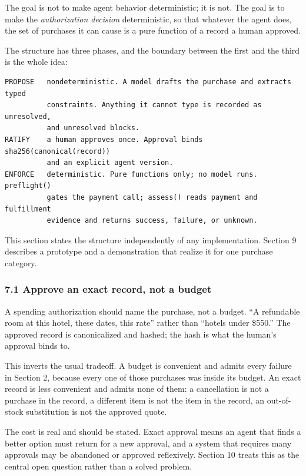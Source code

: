 \documentclass[
  11pt,
  letterpaper,
]{article}
\newcounter{none} %
\begin{document}
The goal is not to make agent behavior deterministic; it is not. The
goal is to make the \emph{authorization decision} deterministic, so that
whatever the agent does, the set of purchases it can cause is a pure
function of a record a human approved.

The structure has three phases, and the boundary between the first and
the third is the whole idea:

\begin{verbatim}
PROPOSE   nondeterministic. A model drafts the purchase and extracts typed
          constraints. Anything it cannot type is recorded as unresolved,
          and unresolved blocks.
RATIFY    a human approves once. Approval binds sha256(canonical(record))
          and an explicit agent version.
ENFORCE   deterministic. Pure functions only; no model runs. preflight()
          gates the payment call; assess() reads payment and fulfillment
          evidence and returns success, failure, or unknown.
\end{verbatim}

This section states the structure independently of any implementation.
Section 9 describes a prototype and a demonstration that realize it for
one purchase category.

\subsubsection{7.1 Approve an exact record, not a
budget}\label{approve-an-exact-record-not-a-budget}

A spending authorization should name the purchase, not a budget. ``A
refundable room at this hotel, these dates, this rate'' rather than
``hotels under \$550.'' The approved record is canonicalized and hashed;
the hash is what the human's approval binds to.

This inverts the usual tradeoff. A budget is convenient and admits every
failure in Section 2, because every one of those purchases was inside
its budget. An exact record is less convenient and admits none of them:
a cancellation is not a purchase in the record, a different item is not
the item in the record, an out-of-stock substitution is not the approved
quote.

The cost is real and should be stated. Exact approval means an agent
that finds a better option must return for a new approval, and a system
that requires many approvals may be abandoned or approved reflexively.
Section 10 treats this as the central open question rather than a solved
problem.
\end{document}
